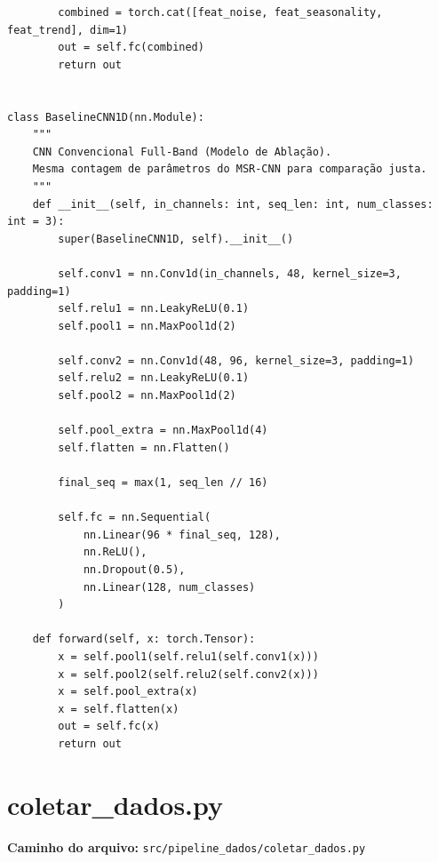 \documentclass{article}
\begin{document}
\begin{verbatim}
        combined = torch.cat([feat_noise, feat_seasonality, feat_trend], dim=1)
        out = self.fc(combined)
        return out


class BaselineCNN1D(nn.Module):
    """
    CNN Convencional Full-Band (Modelo de Ablação).
    Mesma contagem de parâmetros do MSR-CNN para comparação justa.
    """
    def __init__(self, in_channels: int, seq_len: int, num_classes: int = 3):
        super(BaselineCNN1D, self).__init__()
        
        self.conv1 = nn.Conv1d(in_channels, 48, kernel_size=3, padding=1)
        self.relu1 = nn.LeakyReLU(0.1)
        self.pool1 = nn.MaxPool1d(2)
        
        self.conv2 = nn.Conv1d(48, 96, kernel_size=3, padding=1)
        self.relu2 = nn.LeakyReLU(0.1)
        self.pool2 = nn.MaxPool1d(2)
        
        self.pool_extra = nn.MaxPool1d(4)
        self.flatten = nn.Flatten()
        
        final_seq = max(1, seq_len // 16)
            
        self.fc = nn.Sequential(
            nn.Linear(96 * final_seq, 128),
            nn.ReLU(),
            nn.Dropout(0.5),
            nn.Linear(128, num_classes)
        )
        
    def forward(self, x: torch.Tensor):
        x = self.pool1(self.relu1(self.conv1(x)))
        x = self.pool2(self.relu2(self.conv2(x)))
        x = self.pool_extra(x)
        x = self.flatten(x)
        out = self.fc(x)
        return out
\end{verbatim}

\newpage

\section{coletar\_dados.py}
\textbf{Caminho do arquivo:} \texttt{src/pipeline\_dados/coletar\_dados.py}
\end{document}

